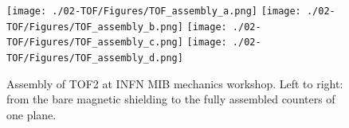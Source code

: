 
\begin{figure}
  \begin{center}
  \texttt{[image: ./02-TOF/Figures/TOF\_assembly\_a.png]}
  \texttt{[image: ./02-TOF/Figures/TOF\_assembly\_b.png]}
  \texttt{[image: ./02-TOF/Figures/TOF\_assembly\_c.png]}
  \texttt{[image: ./02-TOF/Figures/TOF\_assembly\_d.png]}
  \caption{Assembly of TOF2 at INFN MIB mechanics workshop. Left to
    right: from the bare magnetic shielding to the fully assembled
    counters of one plane.}
  \label{fig:TOF2}
  \end{center}
\end{figure}


